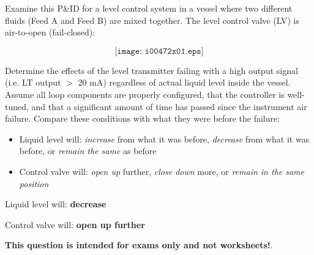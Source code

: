 

Examine this P\&ID for a level control system in a vessel where two different fluids (Feed A and Feed B) are mixed together.  The level control valve (LV) is air-to-open (fail-closed):

$$\texttt{[image: i00472x01.eps]}$$

Determine the effects of the level transmitter failing with a high output signal (i.e. LT output $>$ 20 mA) regardless of actual liquid level inside the vessel.  Assume all loop components are properly configured, that the controller is well-tuned, and that a significant amount of time has passed since the instrument air failure.  Compare these conditions with what they were before the failure:

\begin{itemize}
\item{} Liquid level will: {\it increase} from what it was before, {\it decrease} from what it was before, or {\it remain the same} as before
\vskip 10pt
\item{} Control valve will: {\it open up} further, {\it close down} more, or {\it remain in the same position} 
\end{itemize}







\item{} Liquid level will: {\bf decrease}
\vskip 5pt
\item{} Control valve will: {\bf open up further}







{\bf This question is intended for exams only and not worksheets!}.



